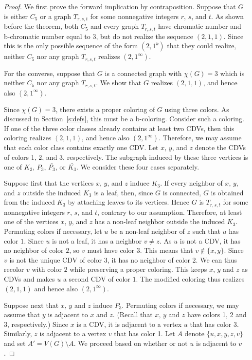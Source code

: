 \documentclass[10pt,a4paper]{amsart}
\begin{document}
\begin{proof}
We first prove the forward implication by contraposition. Suppose that $G$ is either $C_5$ or a graph $T_{r,s,t}$ for some nonnegative integers $r$, $s$, and $t$. As shown before the theorem, both $C_5$ and every graph $T_{r,s,t}$ have chromatic number and b-chromatic number equal to $3$, but do not realize the sequence $(2,1,1)$. Since this is the only possible sequence of the form $(2,1^k)$ that they could realize, neither $C_5$ nor any graph $T_{r,s,t}$ realizes $(2,1^\infty)$.

For the converse, suppose that $G$ is a connected graph with $\chi(G)=3$ which is neither $C_5$ nor any graph $T_{r,s,t}$. We show that $G$ realizes $(2,1,1)$, and hence also $(2,1^\infty)$.

Since $\chi(G)=3$, there exists a proper coloring of $G$ using three colors.
As discussed in Section~\ref{s:defs}, this must be a b-coloring.
Consider such a coloring.
If one of the three color classes already contains at least two CDVs, then this coloring realizes $(2,1,1)$, and hence also $(2,1^\infty)$. Therefore, we may assume that each color class contains exactly one CDV. Let $x$, $y$, and $z$ denote the CDVs of colors $1$, $2$, and $3$, respectively. The subgraph induced by these three vertices is one of $K_3$, $P_3$, $\overline{P_3}$, or $\overline{K_3}$. We consider these four cases separately.

\smallskip

Suppose first that the vertices $x$, $y$, and $z$ induce $K_3$. If every neighbor of $x$, $y$, and $z$ outside the induced $K_3$ is a leaf, then, since $G$ is connected, $G$ is obtained from the induced $K_3$ by attaching leaves to its vertices. Hence $G$ is $T_{r,s,t}$ for some nonnegative integers $r$, $s$, and $t$, contrary to our assumption. 
Therefore, at least one of the vertices $x$, $y$, and $z$ has a non-leaf neighbor outside the induced $K_3$. 
Permuting colors if necessary,
let $u$ be a non-leaf neighbor of $z$ such that $u$ has color $1$. 
Since $u$ is not a leaf, it has a neighbor $v\neq z$.
As $u$ is not a CDV, it has no neighbor of color $2$, so
$v$ must
have color $3$.
This means that $v\not\in\{x,y\}$.
Since $v$ is not the 
unique
CDV of color $3$, it has no neighbor of color $2$.
We can thus recolor $v$ with color $2$ while preserving a proper coloring.
This keeps $x$, $y$ and $z$ as CDVs and makes $u$ a second CDV of color $1$.
The modified coloring thus realizes $(2,1,1)$ and hence also $(2,1^\infty)$.

\smallskip
Suppose next that $x$, $y$ and $z$ induce $P_3$.
Permuting colors if necessary, we may assume that $y$ is adjacent to $x$ and $z$.
(Recall that $x$, $y$ and $z$ have colors 1, 2 and 3, respectively.)
Since $x$ is a CDV, it is adjacent to a vertex $u$ that has color 3.
Similarly, $z$ is adjacent to a vertex $v$ that has color 1.
Let $A$ denote $\{u,x,y,z,v\}$ and set $A'=V(G)\setminus A$.
We proceed based on whether or not $u$ is adjacent to $v$.


\end{proof}
\end{document}

